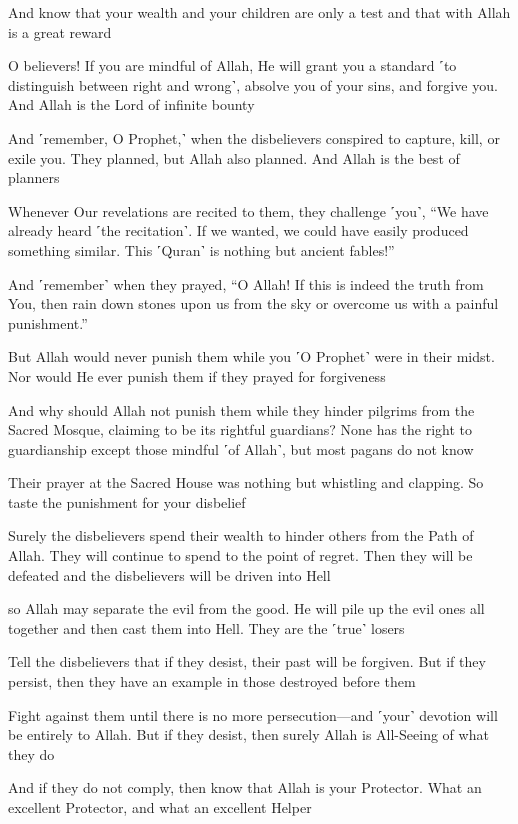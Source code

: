And know that your wealth and your children are only a test and that with Allah is a great reward

O believers! If you are mindful of Allah, He will grant you a standard ˹to distinguish between right and wrong˺, absolve you of your sins, and forgive you. And Allah is the Lord of infinite bounty

And ˹remember, O Prophet,˺ when the disbelievers conspired to capture, kill, or exile you. They planned, but Allah also planned. And Allah is the best of planners

Whenever Our revelations are recited to them, they challenge ˹you˺, “We have already heard ˹the recitation˺. If we wanted, we could have easily produced something similar. This ˹Quran˺ is nothing but ancient fables!”

And ˹remember˺ when they prayed, “O Allah! If this is indeed the truth from You, then rain down stones upon us from the sky or overcome us with a painful punishment.”

But Allah would never punish them while you ˹O Prophet˺ were in their midst. Nor would He ever punish them if they prayed for forgiveness

And why should Allah not punish them while they hinder pilgrims from the Sacred Mosque, claiming to be its rightful guardians? None has the right to guardianship except those mindful ˹of Allah˺, but most pagans do not know

Their prayer at the Sacred House was nothing but whistling and clapping. So taste the punishment for your disbelief

Surely the disbelievers spend their wealth to hinder others from the Path of Allah. They will continue to spend to the point of regret. Then they will be defeated and the disbelievers will be driven into Hell

so Allah may separate the evil from the good. He will pile up the evil ones all together and then cast them into Hell. They are the ˹true˺ losers

Tell the disbelievers that if they desist, their past will be forgiven. But if they persist, then they have an example in those destroyed before them

Fight against them until there is no more persecution—and ˹your˺ devotion will be entirely to Allah. But if they desist, then surely Allah is All-Seeing of what they do

And if they do not comply, then know that Allah is your Protector. What an excellent Protector, and what an excellent Helper

